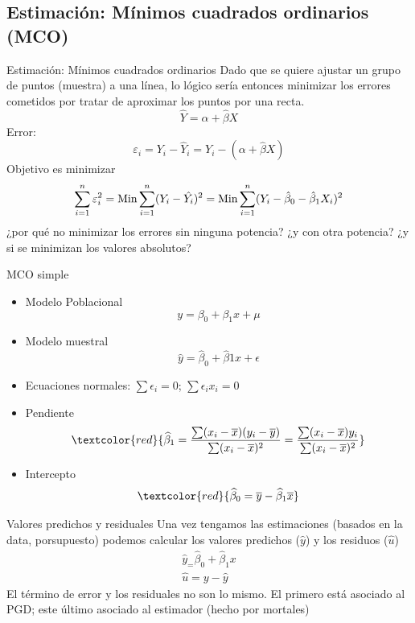 \subsection{Estimación: Mínimos cuadrados ordinarios (MCO)}
\begin{frame}{Estimación: Mínimos cuadrados ordinarios}
	Dado que se quiere ajustar un grupo de puntos (muestra) a una línea, lo lógico sería entonces minimizar los errores cometidos por tratar de aproximar los puntos por una recta.
		$$\hat Y = \alpha+ \widehat{\beta} X$$
	Error:
		$$\varepsilon_i=Y_i-\hat Y_i=Y_i-(\alpha+\widehat{\beta} X)$$
	Objetivo es minimizar 
		$$\sum_{i=1}^n \varepsilon _i ^2 = \textup{Min} \sum_{i=1}^{n} (Y_{i}-\hat{Y_{i}})^{2}=\textup{Min} \sum_{i=1}^{n} (Y_{i}-\hat{\beta}_{0}-\hat{\beta}_{1}X_{i})^{2}$$
	¿por qué no minimizar los errores sin ninguna potencia? ¿y con otra potencia? ¿y si se minimizan los valores absolutos?
\end{frame}
\begin{frame}{MCO simple}
	\begin{itemize}
		\item Modelo Poblacional
		$$y=\beta_{0}+\beta_{1}x+\mu$$
		\item Modelo muestral
		$$\widehat{y}=\widehat{\beta}_{0}+\widehat{\beta}{1}x+\epsilon$$
		\item Ecuaciones normales: $\sum \epsilon_{i}=0$; $\sum \epsilon_{i}x_{i}=0$
		\item Pendiente
		$$\textcolor{red}{\widehat{\beta}_1 = \frac{\sum (x_{i}-\overline{x})(y_{i}-\overline{y})}{\sum (x_{i}-\overline{x})^2}=\frac{\sum (x_{i}-\overline{x})y_{i}}{\sum (x_{i}-\overline{x})^2}}$$
		\item Intercepto
		$$\textcolor{red}{\widehat{\beta}_{0}=\overline{y}-\widehat{\beta}_{1}\overline{x}}$$
	\end{itemize}
\end{frame}
\begin{frame}{Valores predichos y residuales}
	Una vez tengamos las estimaciones (basados en la data, porsupuesto) podemos calcular los valores predichos ($\widehat{y}$) y los residuos ($\widehat{u}$)
	\begin{gather*}
		\widehat{y}_ = \widehat{\beta}_0 + \widehat{\beta}_1x\\
		\widehat{u} = y - \widehat{y}
	\end{gather*}
	El término de error y los residuales no son lo mismo. El primero está asociado al PGD; este último asociado al estimador (hecho por mortales)
\end{frame}
